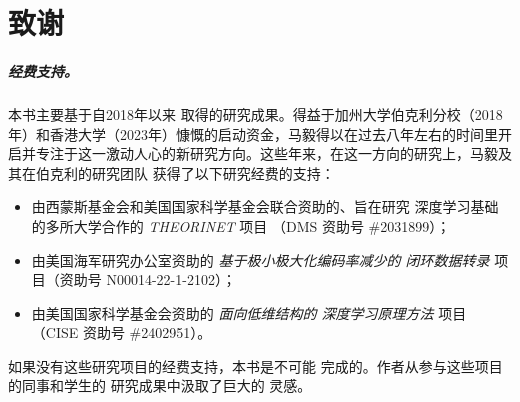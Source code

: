 \documentclass[../../book-main_zh.tex]{subfiles}
\begin{document}
\chapter*{致谢}

\paragraph{经费支持。}
本书主要基于自2018年以来
取得的研究成果。得益于加州大学伯克利分校（2018年）和香港大学（2023年）慷慨的启动资金，马毅得以在过去八年左右的时间里开启并专注于这一激动人心的新研究方向。这些年来，在这一方向的研究上，马毅及其在伯克利的研究团队
获得了以下研究经费的支持：
\begin{itemize}
    \item 由西蒙斯基金会和美国国家科学基金会联合资助的、旨在研究
        深度学习基础的多所大学合作的 {\em THEORINET} 项目
        （DMS 资助号 \#2031899）；
    \item 由美国海军研究办公室资助的 {\em 基于极小极大化编码率减少的
        闭环数据转录} 项目（资助号
        N00014-22-1-2102）；
    \item 由美国国家科学基金会资助的 {\em 面向低维结构的
        深度学习原理方法} 项目
        （CISE 资助号 \#2402951）。
\end{itemize}
如果没有这些研究项目的经费支持，本书是不可能
完成的。作者从参与这些项目的同事和学生的
研究成果中汲取了巨大的
灵感。
\end{document}
